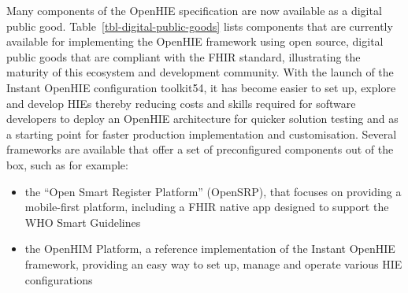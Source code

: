 \documentclass[
  authoryear]{elsarticle}
\providecommand{\tightlist}{%
  \setlength{\itemsep}{0pt}\setlength{\parskip}{0pt}}\usepackage{longtable,booktabs,array}
\begin{document}
Many components of the OpenHIE specification are now available as a
digital public good. Table~\ref{tbl-digital-public-goods} lists
components that are currently available for implementing the OpenHIE
framework using open source, digital public goods that are compliant
with the FHIR standard, illustrating the maturity of this ecosystem and
development community. With the launch of the Instant OpenHIE
configuration toolkit54, it has become easier to set up, explore and
develop HIEs thereby reducing costs and skills required for software
developers to deploy an OpenHIE architecture for quicker solution
testing and as a starting point for faster production implementation and
customisation. Several frameworks are available that offer a set of
preconfigured components out of the box, such as for example:

\begin{itemize}
\tightlist
\item
  the ``Open Smart Register Platform'' (OpenSRP), that focuses on
  providing a mobile-first platform, including a FHIR native app
  designed to support the WHO Smart Guidelines
\item
  the OpenHIM Platform, a reference implementation of the Instant
  OpenHIE framework, providing an easy way to set up, manage and operate
  various HIE configurations
\end{itemize}
\end{document}
